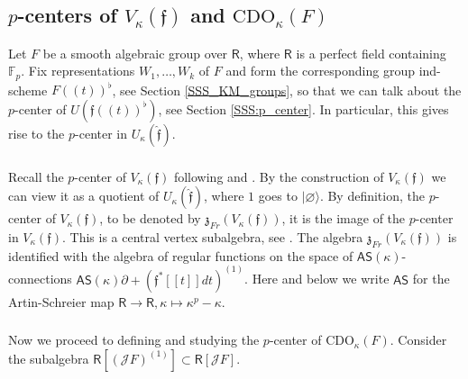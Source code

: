 \documentclass{amsart}
\theoremstyle{definition}
\newcommand{\sss}{\subsubsection{}}
\newcommand{\Ring}{\mathsf{R}}
\newcommand{\F}{\mathbb{F}}
\newcommand{\Jet}{\mathscr{J}}
\newcommand{\ff}{\mathfrak{f}}
\newcommand{\AS}{\mathsf{AS}}
\newcommand{\CDO}{\mathrm{CDO}}
\numberwithin{equation}{section}
\begin{document}
\subsection{$p$-centers of $V_\kappa(\ff)$ and $\CDO_\kappa(F)$}
Let $F$ be a smooth algebraic group over $\Ring$, where $\Ring$ is a perfect field containing $\F_p$. Fix representations $W_1,\ldots,W_k$ of $F$ and form the corresponding group ind-scheme $F(\!(t)\!)^\flat$, see 
Section \ref{SSS_KM_groups}, so that we can talk about the $p$-center of $U(\ff(\!(t)\!)^\flat)$, see Section \ref{SSS:p_center}. In particular, this gives rise to the $p$-center in $U_\kappa(\hat{\ff})$.  

\sss\label{SSS_vertex_p_center}
Recall the $p$-center of $V_\kappa(\ff)$ following \cite[Section 2.3]{AW} and \cite[Section 3.3]{ATV}. By the construction of $V_\kappa(\ff)$ we can view it as a quotient of $U_\kappa(\hat{\ff})$, where $1$  goes to $|\varnothing\rangle$. By definition, the $p$-center of $V_\kappa(\ff)$, to be denoted by $\mathfrak{z}_{Fr}(V_\kappa(\ff))$, it is the image of the $p$-center in $V_\kappa(\ff)$. This is a central vertex subalgebra, see  \cite[Lemma 3.7]{ATV}.
The algebra  $\mathfrak{z}_{Fr}(V_\kappa(\ff))$ is identified with the algebra of regular functions on the space of $\AS(\kappa)$-connections $\AS(\kappa)\partial+ (\ff^*[[t]]dt)^{(1)}$. Here and below we write $\AS$ for the Artin-Schreier map $\Ring\rightarrow \Ring, \kappa\mapsto \kappa^p-\kappa$. 

\sss Now we proceed to defining and studying the $p$-center of $\CDO_\kappa(F)$.  
Consider the subalgebra $\Ring[(\Jet F)^{(1)}]\subset \Ring[\Jet F]$.

\end{document}
